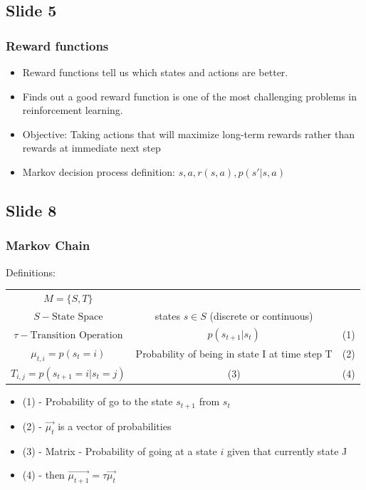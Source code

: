 \documentclass[]{article}
\begin{document}
\subsection*{Slide 5}%
\label{sub:Slide 5}

\subsubsection*{Reward functions}

\begin{itemize}
    \item Reward functions tell us which states and actions are better.
    \item Finds out a good reward function is one of the most challenging problems in reinforcement learning.
    \item Objective: Taking actions that will maximize long-term rewards rather than rewards at immediate next
        step
    \item Markov decision process definition: $s, a, r(s,a), p(s'|s,a)$
\end{itemize}

\subsection*{Slide 8}
\label{sub:Slide 8}

\subsubsection*{Markov Chain}
\label{sub:Markov Chain}

Definitions: 
\par 


\begin{tabular}{ccc}
    $\mathit{M}= \{S, T\}$ & & \\
    $\mathit{S} - \text{State Space}$ & states $s \in S$ (discrete or continuous) & \\
    $\tau - \text{Transition Operation}$ & $p(s_{t + 1}|s_{t})$ &  (1)\\
    $\mu_{t,i} = p(s_{t} = i)$ & Probability of being in state I at time step T &  (2)\\
    $\mathit{T_{i,j}} = p(s_{t + 1} = i | s_{t} = j)$ & (3) &  (4)\\
\end{tabular}


\begin{itemize}
    \item (1) - Probability of go to the state $s_{t+1} $ from $s_{t}$
    \item (2) - $\vec{\mu_{t}}$ is a vector of probabilities
    \item (3) - Matrix - Probability of going at a state $i$ given that currently state J
    \item (4) - then $\vec{\mu_{t+1}} = \tau\vec{\mu_{t}}$
\end{itemize}
\end{document}

